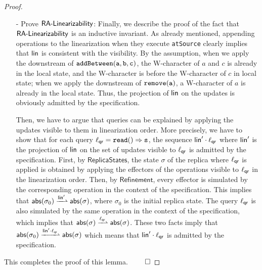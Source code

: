 \begin {proof}
\begin{itemize}
    \item[-] Prove $\mathsf{RA\text{-}Linearizability{}}$: Finally, we describe the proof of the fact that $\mathsf{RA\text{-}Linearizability{}}$ is an inductive invariant. As already mentioned, appending operations to the linearization when they execute \lstinline|atSource| clearly implies that $\mathsf{lin}$ is consistent with the visibility. By the {} assumption, when we apply the downstream of $\alabelshort[{\tt addBetween}]{a,b,c}$, the W-character of $a$ and $c$ is already in the local state, and the W-character is before the W-character of $c$ in local state; when we apply the downstream of $\alabelshort[{\tt remove}]{a}$, a W-character of $a$ is already in the local state. Thus, the projection of $\mathsf{lin}$ on the updates is obviously admitted by the specification.

        Then, we have to argue that queries can be explained by applying the updates visible to them in linearization order. More precisely, we have to show that for each query $\alabel_{\mathsf{qr}} = \alabellongind[{\tt read}]{}{s}{}$, the sequence $\mathsf{lin}'\cdot \ell_{\mathsf{qr}}$ where $\mathsf{lin}'$ is the projection of $\mathsf{lin}$ on the set of updates visible to $\ell_{\mathsf{qr}}$ is admitted by the specification. First, by $\mathsf{ReplicaStates}$, the state $\sigma$ of the replica where $\ell_{\mathsf{qr}}$ is applied is obtained by applying the effectors of the operations visible to $\ell_{\mathsf{qr}}$ in the linearization order. Then, by $\mathsf{Refinement}$, every effector is simulated by the corresponding operation in the context of the specification. This implies that $\refmap(\sigma_0)\xrightharpoonup{\alinord'}\refmap(\sigma)$, where $\sigma_0$ is the initial replica state. The query $\ell_{\mathsf{qr}}$ is also simulated by the same operation in the context of the specification, which implies that $\refmap(\sigma)\xrightharpoonup{\alabel_{\mathsf{qr}}}\refmap(\sigma)$. These two facts imply that $\refmap(\sigma_0)\xrightharpoonup{\alinord'\cdot \alabel_{\mathsf{qr}}}\refmap(\sigma)$ which means that $\mathsf{lin}'\cdot \ell_{\mathsf{qr}}$ is admitted by the specification.
\end{itemize}

This completes the proof of this lemma. $\qed$
\end {proof}























